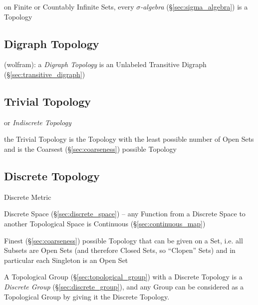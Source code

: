 \fist on Finite or Countably Infinite Sets, every \emph{$\sigma$-algebra}
(\S\ref{sec:sigma_algebra}) is a Topology



\subsection{Digraph Topology}\label{sec:digraph_topology}

(wolfram): a \emph{Digraph Topology} is an Unlabeled Transitive Digraph
(\S\ref{sec:transitive_digraph})



\subsection{Trivial Topology}\label{sec:trivial_topology}

or \emph{Indiscrete Topology}

the Trivial Topology is the Topology with the least possible number of Open
Sets and is the Coarsest (\S\ref{sec:coarseness}) possible Topology



\subsection{Discrete Topology}\label{sec:discrete_topology}

Discrete Metric

Discrete Space (\S\ref{sec:discrete_space}) -- any Function from a Discrete
Space to another Topological Space is Continuous (\S\ref{sec:continuous_map})

Finest (\S\ref{sec:coarseness}) possible Topology that can be given on a Set,
i.e. all Subsets are Open Sets (and therefore Closed Sets, so ``Clopen'' Sets)
and in particular each Singleton is an Open Set

A Topological Group (\S\ref{sec:topological_group}) with a Discrete Topology is
a \emph{Discrete Group} (\S\ref{sec:discrete_group}), and any Group can be
considered as a Topological Group by giving it the Discrete Topology.



